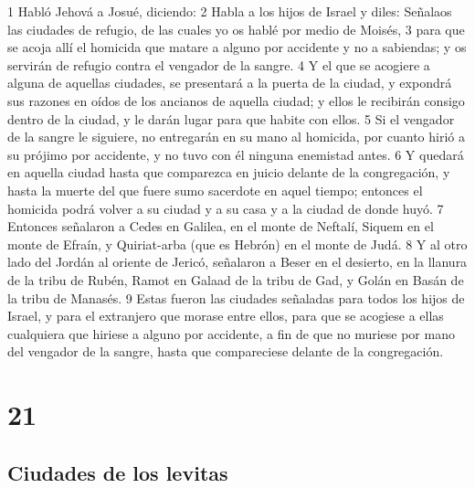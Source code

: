 1 Habló Jehová a Josué, diciendo:
2 Habla a los hijos de Israel y diles: Señalaos las ciudades de refugio, de las cuales yo os hablé por medio de Moisés, 
3 para que se acoja allí el homicida que matare a alguno por accidente y no a sabiendas; y os servirán de refugio contra el vengador de la sangre.
4 Y el que se acogiere a alguna de aquellas ciudades, se presentará a la puerta de la ciudad, y expondrá sus razones en oídos de los ancianos de aquella ciudad; y ellos le recibirán consigo dentro de la ciudad, y le darán lugar para que habite con ellos.
5 Si el vengador de la sangre le siguiere, no entregarán en su mano al homicida, por cuanto hirió a su prójimo por accidente, y no tuvo con él ninguna enemistad antes.
6 Y quedará en aquella ciudad hasta que comparezca en juicio delante de la congregación, y hasta la muerte del que fuere sumo sacerdote en aquel tiempo; entonces el homicida podrá volver a su ciudad y a su casa y a la ciudad de donde huyó.
7 Entonces señalaron a Cedes en Galilea, en el monte de Neftalí, Siquem en el monte de Efraín, y Quiriat-arba (que es Hebrón) en el monte de Judá.
8 Y al otro lado del Jordán al oriente de Jericó, señalaron a Beser en el desierto, en la llanura de la tribu de Rubén, Ramot en Galaad de la tribu de Gad, y Golán en Basán de la tribu de Manasés.
9 Estas fueron las ciudades señaladas para todos los hijos de Israel, y para el extranjero que morase entre ellos, para que se acogiese a ellas cualquiera que hiriese a alguno por accidente, a fin de que no muriese por mano del vengador de la sangre, hasta que compareciese delante de la congregación.

\chapter{21}

\section*{Ciudades de los levitas }


